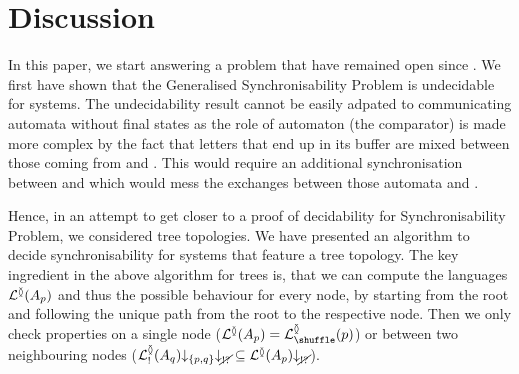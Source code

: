 \documentclass[submission,copyright,creativecommons,UKenglish]{eptcs}
\begin{document}
%
%
%
%
%

\section{Discussion}
\label{sec:concl}

In this paper, we start answering a problem that have remained open since \cite{finkel_synchronizability_2017}. We first have shown that the Generalised Synchronisability Problem is undecidable for \Mailbox systems.  The undecidability result cannot be easily adpated to communicating automata without final states as the role of automaton  (\ie the comparator) is made more complex by the fact that letters that end up in its buffer are mixed between those coming from  and . This would require an additional synchronisation between  and   which would mess the exchanges between those automata and .

Hence, in an attempt to get closer to a proof of decidability for Synchronisability Problem, we considered tree topologies. 
We have presented an algorithm to decide synchronisability for systems that feature a tree topology.
The key ingredient in the above algorithm for trees is, that we can compute the languages $ \mathcal{L}^{\between}{\left( A_{p} \right)} $ and thus the possible behaviour for every node, by starting from the root and following the unique path from the root to the respective node.
Then we only check properties on a single node ($ \LangTree{\Automaton{p}} = \LangShuffle{p} $) or between two neighbouring nodes ($ \mathcal{L}_{!}^{\between}{\left( A_{q} \right)}{\downarrow_{{\left\lbrace p, q \right\rbrace}}}{\downarrow_{\cancel{!?}}} \subseteq \mathcal{L}^{\between}{\left( A_{p} \right)}{\downarrow_{\cancel{!?}}} $).
\end{document}
